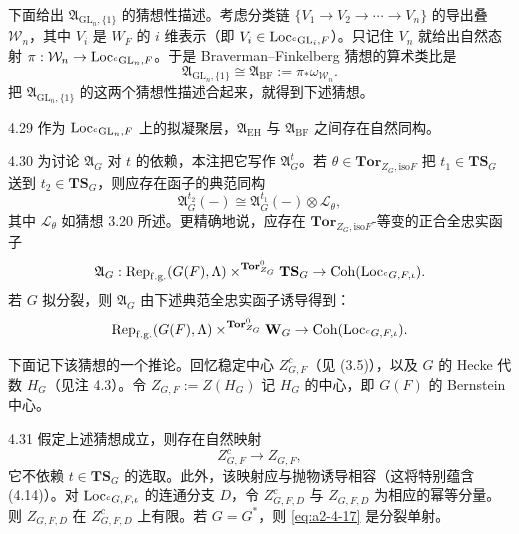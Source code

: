 下面给出 $\mathfrak A_{\mathrm{GL}_n,\{1\}}$ 的猜想性描述。考虑分类链 $\{V_1\to V_2\to\cdots\to V_n\}$ 的导出叠 $\mathcal W_n$，其中 $V_i$ 是 $W_F$ 的 $i$ 维表示（即 $V_i\in\operatorname{Loc}_{{}^{c}\mathrm{GL}_i,F}$）。只记住 $V_n$ 就给出自然态射 $\pi:\mathcal W_n\to\operatorname{Loc}_{{}^{c}\mathrm{GL}_n,F}$。于是 Braverman–Finkelberg 猜想的算术类比是
\[
\mathfrak A_{\mathrm{GL}_n,\{1\}}\cong\mathfrak A_{\mathrm{BF}}:=\pi_*\omega_{\mathcal W_n}.
\]
把 $\mathfrak A_{\mathrm{GL}_n,\{1\}}$ 的这两个猜想性描述合起来，就得到下述猜想。

\begin{conj}{4.29}\label{thm:a2-4-29}
作为 $\operatorname{Loc}_{{}^{c}\mathrm{GL}_n,F}$ 上的拟凝聚层，$\mathfrak A_{\mathrm{EH}}$ 与 $\mathfrak A_{\mathrm{BF}}$ 之间存在自然同构。
\end{conj}

\begin{rem}{4.30}\label{thm:a2-4-30}
为讨论 $\mathfrak A_G$ 对 $t$ 的依赖，本注把它写作 $\mathfrak A^t_G$。若 $\theta\in\mathbf{Tor}_{Z_G,\mathrm{iso}F}$ 把 $t_1\in\mathbf{TS}_G$ 送到 $t_2\in\mathbf{TS}_G$，则应存在函子的典范同构
\begin{equation}
\mathfrak A^{t_2}_G(-)\cong\mathfrak A^{t_1}_G(-)\otimes\mathcal L_\theta, \tag{4.16}\label{eq:a2-4-16}
\end{equation}
其中 $\mathcal L_\theta$ 如猜想 3.20 所述。更精确地说，应存在 $\mathbf{Tor}_{Z_G,\mathrm{iso}F}$-等变的正合全忠实函子
\[
\mathfrak A_G:\operatorname{Rep}_{\mathrm{f.g.}}(G(F),\Lambda)\times^{\mathbf{Tor}^0_{Z_G}}\mathbf{TS}_G\to\operatorname{Coh}(\operatorname{Loc}_{{}^{c}G,F,\iota}).
\]
若 $G$ 拟分裂，则 $\mathfrak A_G$ 由下述典范全忠实函子诱导得到：
\[
\operatorname{Rep}_{\mathrm{f.g.}}(G(F),\Lambda)\times^{\mathbf{Tor}^0_{Z_G}}\mathbf W_G\to\operatorname{Coh}(\operatorname{Loc}_{{}^{c}G,F,\iota}).
\]
\end{rem}

下面记下该猜想的一个推论。回忆稳定中心 $Z^{c}_{G,F}$（见 (3.5)），以及 $G$ 的 Hecke 代数 $H_G$（见注 4.3）。令 $Z_{G,F}:=Z(H_G)$ 记 $H_G$ 的中心，即 $G(F)$ 的 Bernstein 中心。

\begin{cor}{4.31}\label{thm:a2-4-31}
假定上述猜想成立，则存在自然映射
\begin{equation}
Z^{c}_{G,F}\to Z_{G,F}, \tag{4.17}\label{eq:a2-4-17}
\end{equation}
它不依赖 $t\in\mathbf{TS}_G$ 的选取。此外，该映射应与抛物诱导相容（这将特别蕴含 (4.14)）。对 $\operatorname{Loc}_{{}^{c}G,F,\iota}$ 的连通分支 $D$，令 $Z^{c}_{G,F,D}$ 与 $Z_{G,F,D}$ 为相应的幂等分量。则 $Z_{G,F,D}$ 在 $Z^{c}_{G,F,D}$ 上有限。若 $G=G^*$，则 \eqref{eq:a2-4-17} 是分裂单射。
\end{cor}

